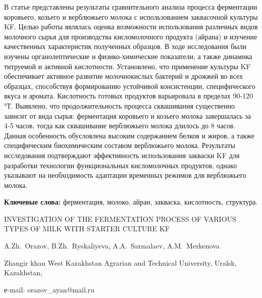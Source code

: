 В статье представлены результаты сравнительного анализа процесса
ферментации коровьего, козьего и верблюжьего молока с использованием
заквасочной культуры KF. Целью работы являлась оценка возможности
использования различных видов молочного сырья для производства
кисломолочного продукта (айрана) и изучение качественных характеристик
полученных образцов. В ходе исследования были изучены органолептические
и физико-химические показатели, а также динамика титруемой и активной
кислотности. Установлено, что применение культуры KF обеспечивает
активное развитие молочнокислых бактерий и дрожжей во всех образцах,
способствуя формированию устойчивой консистенции, специфического вкуса и
аромата. Кислотность готовых продуктов варьировала в пределах 90-120 °Т.
Выявлено, что продолжительность процесса сквашивания существенно зависит
от вида сырья: ферментация коровьего и козьего молока завершалась за 4-5
часов, тогда как сквашивание верблюжьего молока длилось до 8 часов.
Данная особенность обусловлена высоким содержанием белков и жиров, а
также специфическим биохимическим составом верблюжьего молока.
Результаты исследования подтверждают эффективность использования
закваски KF для разработки технологии функциональных кисломолочных
продуктов, однако указывают на необходимость адаптации временных режимов
для верблюжьего молока.

{\bfseries Ключевые слова:} ферментация, молоко, айран, закваска,
кислотность, структура.

\begin{header}
INVESTIGATION OF THE FERMENTATION PROCESS OF VARIOUS TYPES OF MILK WITH STARTER CULTURE KF

A.Zh.~Orazov\envelope,
B.Zh.~Ryskaliyeva,
A.A.~Sarmalaev,
A.M.~Merkenova
\end{header}

\begin{affil}
Zhangir khan West Kazakhstan Agrarian and Technical University, Uralsk, Kazakhstan,

е-mail: orazov\_ayan@mail.ru
\end{affil}

